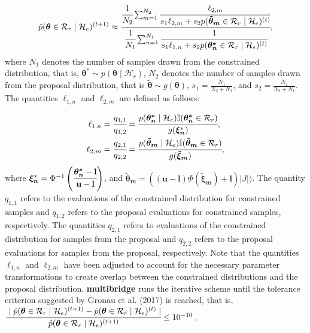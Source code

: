 \documentclass[
  english,
  man,floatsintext]{apa6}
\begin{document}
\begin{align*}
    \hat p(\boldsymbol{\theta} \in \mathcal{R}_r \mid \mathcal{H}_e)^{(t+1)} \approx \cfrac{\cfrac{1}{N_2} \sum_{m = 1}^{N_2} \cfrac{\ell_{2,m}}{s_1 \ell_{2,m} + s_2 p(\boldsymbol{\tilde \theta_m} \in \mathcal{R}_r \mid \mathcal{H}_e)^{(t)}}}
    {\cfrac{1}{N_1} \sum_{n = 1}^{N_1} \cfrac{1}{s_1 \ell_{1,n} + s_2 p(\boldsymbol{\theta^*_n} \in \mathcal{R}_r \mid \mathcal{H}_e)^{(t)}}},
\end{align*}
where \(N_1\) denotes the number of samples drawn from the constrained distribution, that is, \(\boldsymbol{\theta}^* \sim p(\boldsymbol{\theta} \mid \mathcal{H}_r)\), \(N_2\) denotes the number of samples drawn from the proposal distribution, that is \(\boldsymbol{\tilde \theta} \sim g(\boldsymbol{\theta})\),
\(s_1 = \frac{N_1}{N_2 + N_1}\), and \(s_2 = \frac{N_2}{N_2 + N_1}\). The quantities \(\ell_{1,n}\) and \(\ell_{2,m}\) are defined as follows:

\begin{align}
    \ell_{1,n} &= \cfrac{q_{1,1}}{q_{1,2}}  = \cfrac{p(\boldsymbol{\theta^*_n}\mid \mathcal{H}_e) \mathbb{I}(\boldsymbol{\theta^*_n}\in\mathcal{R}_r)}{g(\boldsymbol{\xi_n}^*)},\\
    \ell_{2,m} &= \cfrac{q_{2,1}}{q_{2,2}} = \cfrac{p(\boldsymbol{\tilde \theta_m}\mid \mathcal{H}_e) \mathbb{I}(\boldsymbol{\tilde \theta_m}\in\mathcal{R}_r)}{g(\boldsymbol{\tilde \xi_m})},
\end{align}
where \(\boldsymbol{\xi_n}^* = \Phi^{-1}\left(\cfrac{\boldsymbol{\theta^*_n} - \mathbf{l}}{\mathbf{u} - \mathbf{l}}\right)\), and \(\boldsymbol{\tilde \theta_m} = ((\mathbf{u} - \mathbf{l})\Phi(\boldsymbol{\tilde \xi_m}) + \mathbf{l}) \left|J\right|)\). The quantity \(q_{1,1}\) refers to the evaluations of the constrained distribution for constrained samples and \(q_{1,2}\) refers to the proposal evaluations for constrained samples, respectively. The quantities \(q_{2,1}\) refers to evaluations of the constrained distribution for samples from the proposal and \(q_{2,2}\) refers to the proposal evaluations for samples from the proposal, respectively. Note that the quantities \(\ell_{1,n}\) and \(\ell_{2,m}\) have been adjusted to account for the necessary parameter transformations to create overlap between the constrained distributions and the proposal distribution. \textbf{multibridge} runs the iterative scheme until the tolerance criterion suggested by Gronau et al. (2017) is reached, that is, \(\cfrac{\mid \hat p(\boldsymbol{\theta} \in \mathcal{R}_r \mid \mathcal{H}_e)^{(t + 1)} - \hat p(\boldsymbol{\theta} \in \mathcal{R}_r \mid \mathcal{H}_e)^{(t)} \mid}{\hat p(\boldsymbol{\theta} \in \mathcal{R}_r \mid \mathcal{H}_e)^{(t + 1)}} \leq 10^{-10}\).
\end{document}
